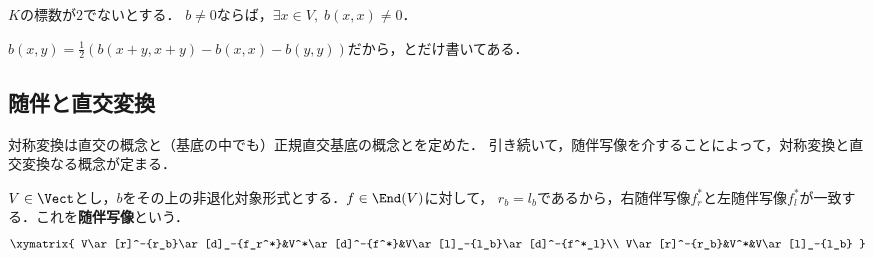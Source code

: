 \documentclass[uplatex, dvipdfmx]{jsreport}
\begin{document}
\begin{lemma}
    $K$の標数が$2$でないとする．
    $b\ne 0$ならば，$\exists x\in V,\;b(x,x)\ne 0$．
\end{lemma}
\begin{Proof}
    $b(x,y)=\frac{1}{2}(b(x+y,x+y)-b(x,x)-b(y,y))$だから，とだけ書いてある．
\end{Proof}

\subsection{随伴と直交変換}

\begin{tcolorbox}[colframe=ForestGreen, colback=ForestGreen!10!white, breakable]
    対称変換は直交の概念と（基底の中でも）正規直交基底の概念とを定めた．
    引き続いて，随伴写像を介することによって，対称変換と直交変換なる概念が定まる．
\end{tcolorbox}

\begin{definition}
    $V\in\Vect$とし，$b$をその上の非退化対象形式とする．$f\in\End(V)$に対して，
    $r_b=l_b$であるから，右随伴写像$f^*_r$と左随伴写像$f^*_l$が一致する．これを\textbf{随伴写像}という．
    \[\xymatrix{
        V\ar[r]^-{r_b}\ar[d]_-{f_r^*}&V^*\ar[d]^-{f^*}&V\ar[l]_-{l_b}\ar[d]^-{f^*_l}\\
        V\ar[r]^-{r_b}&V^*&V\ar[l]_-{l_b}
    }\]
\end{definition}
\end{document}
